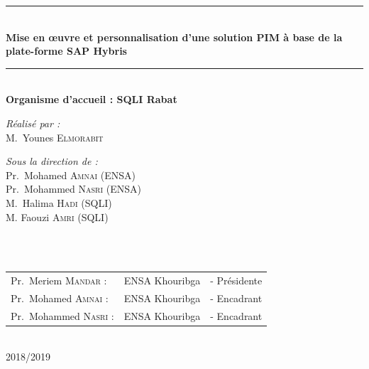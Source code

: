 \documentclass[a4paper,12pt]{report}
\begin{document}
\begin{titlepage}
\begin{center}
\rule{\linewidth}{0.3mm} \\[0.4cm]
{ \huge \bfseries\color{blue!70!black} Mise en œuvre et personnalisation d'une solution PIM à base de la plate-forme SAP Hybris \\[0.4cm] }
\rule{\linewidth}{0.3mm} \\[1cm]
{\large \bfseries Organisme d'accueil : SQLI Rabat}\\[1cm]
\noindent
\begin{minipage}{0.4\textwidth}
  \begin{flushleft} \large
    \emph{\color{orange!80!black}Réalisé par :}\\
    M.~Younes \textsc{Elmorabit}\\
  \end{flushleft}
\end{minipage}%
\begin{minipage}{0.5\textwidth}
  \begin{flushright} \large
    \emph{\color{orange!80!black}Sous la direction de :} \\
    Pr.~Mohamed \textsc{Amnai} (ENSA)\\
    Pr.~Mohammed \textsc{Nasri} (ENSA)\\
    M.~Halima \textsc{Hadi} (SQLI)\\
    M. Faouzi \textsc{Amri} (SQLI)\\
  \end{flushright}
\end{minipage}\\[1cm]

\\[0.5cm]

\color{black}
\centering
\begin{tabular}{lll}
\large Pr.~Meriem \textsc{Mandar} : & \large ENSA Khouribga & \large - Présidente \\[0.1cm]
\large Pr.~Mohamed \textsc{Amnai} : & \large ENSA Khouribga & \large - Encadrant \\[0.1cm]
\large Pr.~Mohammed \textsc{Nasri} : & \large ENSA Khouribga & \large - Encadrant
\end{tabular}

\vfill

{\large \color{orange!80!black}{Année universitaire}\\ \color{blue!80!black}2018/2019}

\end{center}
\end{titlepage}
\end{document}

